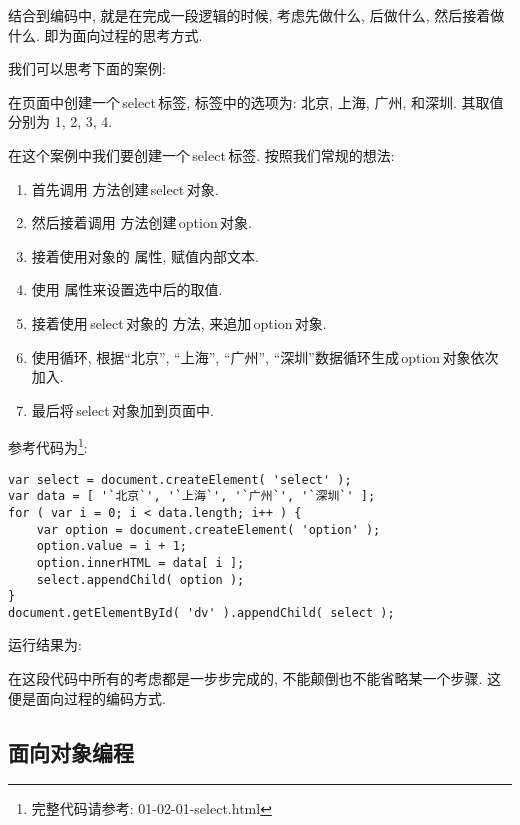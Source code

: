 结合到编码中, 就是在完成一段逻辑的时候, 考虑先做什么, 后做什么, 然后接着做什么. 即为面向过程的思考方式.

我们可以思考下面的案例:

\begin{jdemo}
    在页面中创建一个\,select\,标签, 标签中的选项为: 北京, 上海, 广州, 和深圳. 其取值分别为 1, 2, 3, 4.
\end{jdemo}

在这个案例中我们要创建一个\,select\,标签. 按照我们常规的想法:%
%
\begin{enumerate}
\item 首先调用\,\,方法创建\,select\,对象.
\item 然后接着调用\,\,方法创建\,option\,对象.
\item 接着使用对象的\,\,属性, 赋值内部文本.
\item 使用\,\,属性来设置选中后的取值.
\item 接着使用\,select\,对象的\,\,方法, 来追加\,option\,对象.
\item 使用循环, 根据``北京'', ``上海'', ``广州'', ``深圳''数据循环生成\,option\,对象依次加入.
\item 最后将\,select\,对象加到页面中.
\end{enumerate}

\noindent
参考代码为\footnote{完整代码请参考: \textsf{01-02-01-select.html}}:%
%
\begin{lstlisting}
var select = document.createElement( 'select' );
var data = [ '`北京`', '`上海`', '`广州`', '`深圳`' ];
for ( var i = 0; i < data.length; i++ ) {
    var option = document.createElement( 'option' );
    option.value = i + 1;
    option.innerHTML = data[ i ];
    select.appendChild( option );
}
document.getElementById( 'dv' ).appendChild( select );
\end{lstlisting}%
%
运行结果为:\\
%

在这段代码中所有的考虑都是一步步完成的, 不能颠倒也不能省略某一个步骤. 这便是面向过程的编码方式.





\subsection{面向对象编程}

